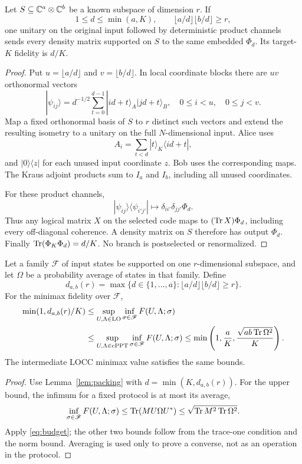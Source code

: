 \begin{lemma}\label{lem:packing}
Let $S\subseteq\mathbb C^a\otimes\mathbb C^b$ be a known subspace of dimension $r$. If
\begin{equation}\label{eq:packing-feasible}
 1\le d\le\min(a,K),\qquad
 \lfloor a/d\rfloor\lfloor b/d\rfloor\ge r,
\end{equation}
one unitary on the original input followed by deterministic product channels sends every density matrix supported on $S$ to the same embedded $\Phi_d$. Its target-$K$ fidelity is $d/K$.
\end{lemma}
\begin{proof}
Put $u=\lfloor a/d\rfloor$ and $v=\lfloor b/d\rfloor$. In local coordinate blocks there are $uv$ orthonormal vectors
\[
 |\psi_{ij}\rangle=d^{-1/2}\sum_{t=0}^{d-1}
 |id+t\rangle_A|jd+t\rangle_B,
 \quad 0\le i<u,\quad0\le j<v.
\]
Map a fixed orthonormal basis of $S$ to $r$ distinct such vectors and extend the resulting isometry to a unitary on the full $N$-dimensional input. Alice uses
\[
 A_i=\sum_{t<d}|t\rangle_K\langle id+t|,
\]
and $|0\rangle\langle z|$ for each unused input coordinate $z$. Bob uses the corresponding maps. The Kraus adjoint products sum to $I_a$ and $I_b$, including all unused coordinates.

For these product channels,
\[
 |\psi_{ij}\rangle\langle\psi_{i'j'}|
 \longmapsto \delta_{ii'}\delta_{jj'}\Phi_d.
\]
Thus any logical matrix $X$ on the selected code maps to $(\operatorname{Tr} X)\Phi_d$, including every off-diagonal coherence. A density matrix on $S$ therefore has output $\Phi_d$. Finally $\operatorname{Tr}(\Phi_K\Phi_d)=d/K$. No branch is postselected or renormalized.
\end{proof}

\begin{proposition}\label{prop:average}
Let a family $\mathscr F$ of input states be supported on one $r$-dimensional subspace, and let $\Omega$ be a probability average of states in that family. Define
\[
 d_{a,b}(r)=\max\{d\in\{1,\ldots,a\}:\lfloor a/d\rfloor\lfloor b/d\rfloor\ge r\}.
\]
For the minimax fidelity over $\mathscr F$,
\begin{align}\label{eq:general-minimax}
 \min(1,d_{a,b}(r)/K)
 &\le\sup_{U,\Lambda\in\mathrm{LO}}\inf_{\sigma\in\mathscr F}F(U,\Lambda;\sigma)\nonumber\\
 &\le\sup_{U,\Lambda\in\mathrm{cPPT}}\inf_{\sigma\in\mathscr F}F(U,\Lambda;\sigma)
 \le\min\left(1,\frac aK,\frac{\sqrt{ab\operatorname{Tr}\Omega^2}}K\right).
\end{align}
The intermediate LOCC minimax value satisfies the same bounds.
\end{proposition}
\begin{proof}
Use Lemma~\ref{lem:packing} with $d=\min(K,d_{a,b}(r))$. For the upper bound, the infimum for a fixed protocol is at most its average,
\[
 \inf_{\sigma\in\mathscr F}F(U,\Lambda;\sigma)
 \le\operatorname{Tr}(MU\Omega U^*)
 \le\sqrt{\operatorname{Tr} M^2\operatorname{Tr}\Omega^2}.
\]
Apply \eqref{eq:budget}; the other two bounds follow from the trace-one condition and the norm bound. Averaging is used only to prove a converse, not as an operation in the protocol.
\end{proof}

